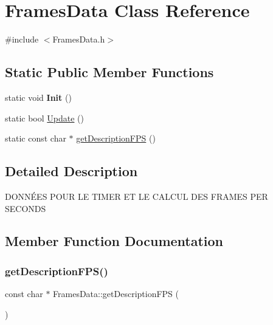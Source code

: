 \hypertarget{classFramesData}{}\section{Frames\+Data Class Reference}
\label{classFramesData}


{\ttfamily \#include $<$Frames\+Data.\+h$>$}

\subsection*{Static Public Member Functions}
\begin{DoxyCompactItemize}
\item 
\mbox{\label{classFramesData_adb376443cd35cdf789334e5216799632}} 
static void {\bfseries Init} ()
\item 
static bool \mbox{\hyperlink{classFramesData_a0a13292d2ffde616533d2185de424af1}{Update}} ()
\item 
static const char $\ast$ \mbox{\hyperlink{classFramesData_a2e4c0df27e34dd492dae0b3c674838aa}{get\+Description\+F\+PS}} ()
\end{DoxyCompactItemize}


\subsection{Detailed Description}
D\+O\+N\+NÉ\+ES P\+O\+UR LE T\+I\+M\+ER ET LE C\+A\+L\+C\+UL D\+ES F\+R\+A\+M\+ES P\+ER S\+E\+C\+O\+N\+DS 

\subsection{Member Function Documentation}
\mbox{\label{classFramesData_a2e4c0df27e34dd492dae0b3c674838aa}} 
\subsubsection{\texorpdfstring{getDescriptionFPS()}{getDescriptionFPS()}}
{\footnotesize\ttfamily const char $\ast$ Frames\+Data\+::get\+Description\+F\+PS (\begin{DoxyParamCaption}{ }\end{DoxyParamCaption})\hspace{0.3cm}{\ttfamily [static]}}

